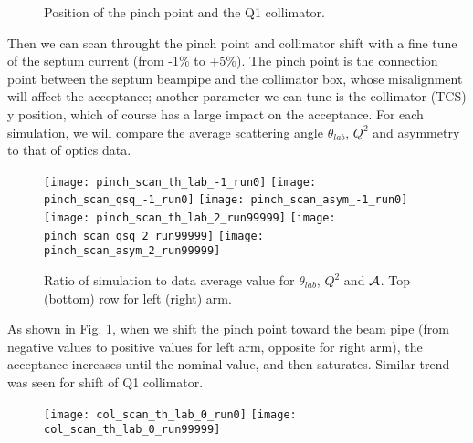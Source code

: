 \begin{figure}[H]
    \centering
    \caption{Position of the pinch point and the Q1 collimator.}
\end{figure}
Then we can scan throught the pinch point and collimator shift with a fine tune
of the septum current (from -1\% to +5\%). The pinch point is the connection point
between the septum beampipe and the collimator box, whose misalignment will affect
the acceptance; another parameter we can tune is the collimator (TCS) y position,
which of course has a large impact on the acceptance. For each simulation, we
will compare the average scattering angle $\theta_{lab}$, $Q^2$ and asymmetry to
that of optics data.

\begin{figure}[H]
    \centering
    \texttt{[image: pinch\_scan\_th\_lab\_-1\_run0]}
    \texttt{[image: pinch\_scan\_qsq\_-1\_run0]}
    \texttt{[image: pinch\_scan\_asym\_-1\_run0]}
    \texttt{[image: pinch\_scan\_th\_lab\_2\_run99999]}
    \texttt{[image: pinch\_scan\_qsq\_2\_run99999]}
    \texttt{[image: pinch\_scan\_asym\_2\_run99999]}
    \caption{Ratio of simulation to data average value for 
    $\theta_{lab}$, $Q^2$ and $\mathcal{A}$. Top (bottom) row for left (right) arm.
    }
    \label{fig:pinch_scan}
\end{figure}

As shown in Fig. \ref{fig:pinch_scan}, when we shift the pinch point toward the
beam pipe (from negative values to positive values for left arm, opposite for 
right arm), the acceptance increases until the nominal value, and then saturates. 
Similar trend was seen for shift of Q1 collimator.
\begin{figure}[H]
    \centering
    \texttt{[image: col\_scan\_th\_lab\_0\_run0]}
    \texttt{[image: col\_scan\_th\_lab\_0\_run99999]}
\end{figure}

